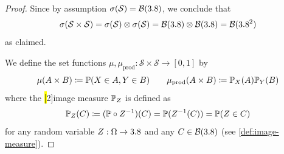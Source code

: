\begin{proof}
Since by assumption $\sigma(\mathcal{S}) = \mathcal{B}(3.8)$, we conclude that
\[
\sigma(\mathcal{S} \times \mathcal{S})
=
\sigma(\mathcal{S}) \otimes \sigma(\mathcal{S})
=
\mathcal{B}(3.8) \otimes \mathcal{B}(3.8)
=
\mathcal{B}(3.8^2)
\]
as claimed.







We define the set functions $\mu, \mu_{\text{prod}} : \mathcal{S} \times \mathcal{S} \to [0,1]$ by
\[
\mu(A \times B) \coloneq \mathbb{P}(X \in A, Y \in B)
\qquad
\mu_{\text{prod}}(A \times B) \coloneq \mathbb{P}_{X}(A) \mathbb{P}_{Y}(B)
\]
where the \hl[2]{image measure} $\mathbb{P}_{Z}$ is defined as
\[
\mathbb{P}_{Z}(C) \coloneq (\mathbb{P} \circ Z^{-1})(C) = \mathbb{P}(Z^{-1}(C)) = \mathbb{P}(Z \in C)
\]
for any random variable $Z : \Omega \to 3.8$ and any $C \in \mathcal{B}(3.8)$ (see \autoref{def:image-measure}).


\end{proof}
